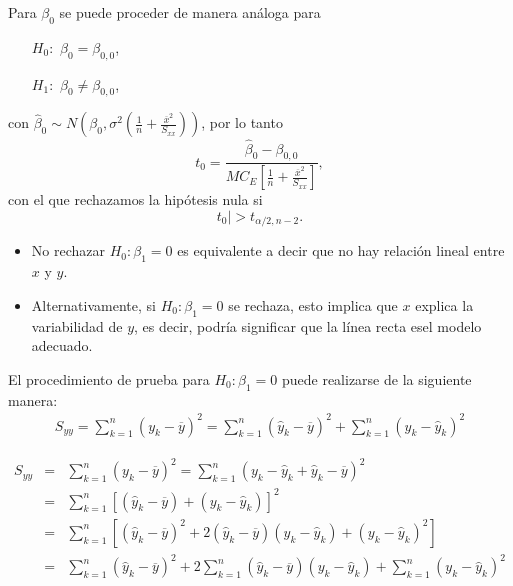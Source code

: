Para $\beta_{0}$ se puede proceder de manera an\'aloga para
\begin{itemize}
\item[$H_{0}:$] $\beta_{0}=\beta_{0,0}$,
\item[$H_{1}:$] $\beta_{0}\neq\beta_{0,0}$,
\end{itemize}
con $\hat{\beta}_{0}\sim N\left(\beta_{0},\sigma^{2}\left(\frac{1}{n}+\frac{\overline{x}^{2}}{S_{xx}}\right)\right)$, por lo tanto
\begin{equation}\label{Estadistico.Beta.0}
t_{0}=\frac{\hat{\beta}_{0}-\beta_{0,0}}{MC_{E}\left[\frac{1}{n}+\frac{\overline{x}^{2}}{S_{xx}}\right]},
\end{equation}
con el que rechazamos la hip\'otesis nula si
\begin{equation}\label{Zona.Rechazo.Beta.0}
t_{0}|>t_{\alpha/2,n-2}.
\end{equation}








\begin{itemize}
\item No rechazar $H_{0}:\beta_{1}=0$ es equivalente a decir que no hay relaci\'on lineal entre $x$ y $y$.
\item Alternativamente, si $H_{0}:\beta_{1}=0$ se rechaza, esto implica que $x$ explica la variabilidad de $y$, es decir, podr\'ia significar que la l\'inea recta esel modelo adecuado.
\end{itemize}
El procedimiento de prueba para $H_{0}:\beta_{1}=0$ puede realizarse de la siguiente manera:
\begin{eqnarray*}
S_{yy}=\sum_{k=1}^{n}\left(y_{k}-\overline{y}\right)^{2}=\sum_{k=1}^{n}\left(\hat{y}_{k}-\overline{y}\right)^{2}+\sum_{k=1}^{n}\left(y_{k}-\hat{y}_{k}\right)^{2}
\end{eqnarray*}






\begin{eqnarray*}
S_{yy}&=&\sum_{k=1}^{n}\left(y_{k}-\overline{y}\right)^{2}=\sum_{k=1}^{n}\left(y_{k}-\hat{y}_{k}+\hat{y}_{k}-\overline{y}\right)^{2}\\
&=&\sum_{k=1}^{n}\left[\left(\hat{y}_{k}-\overline{y}\right)+\left(y_{k}-\hat{y}_{k}\right)\right]^{2}\\
&=&\sum_{k=1}^{n}\left[\left(\hat{y}_{k}-\overline{y}\right)^{2}+2\left(\hat{y}_{k}-\overline{y}\right)\left(y_{k}-\hat{y}_{k}\right)+\left(y_{k}-\hat{y}_{k}\right)^{2}\right]\\
&=&\sum_{k=1}^{n}\left(\hat{y}_{k}-\overline{y}\right)^{2}+2\sum_{k=1}^{n}\left(\hat{y}_{k}-\overline{y}\right)\left(y_{k}-\hat{y}_{k}\right)+\sum_{k=1}^{n}\left(y_{k}-\hat{y}_{k}\right)^{2}
\end{eqnarray*}


